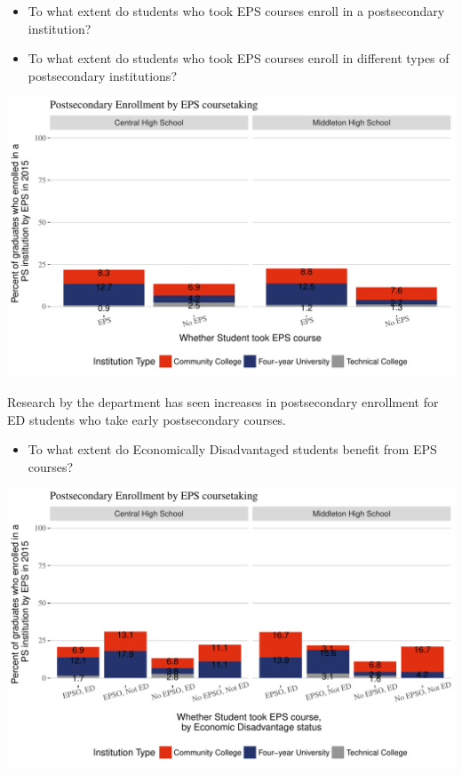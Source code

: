 \documentclass[11pt,]{article}
\providecommand{\tightlist}{%
  \setlength{\itemsep}{0pt}\setlength{\parskip}{0pt}}
\begin{document}
\begin{itemize}
\tightlist
\item
  To what extent do students who took EPS courses enroll in a
  postsecondary institution?
\item
  To what extent do students who took EPS courses enroll in different
  types of postsecondary institutions?
\end{itemize}

\includegraphics{20170411_PSWRR_no_CTE_files/figure-latex/Figure9d-1.pdf}

Research by the department has seen increases in postsecondary
enrollment for ED students who take early postsecondary courses.

\begin{itemize}
\tightlist
\item
  To what extent do Economically Disadvantaged students benefit from EPS
  courses?
\end{itemize}

\includegraphics{20170411_PSWRR_no_CTE_files/figure-latex/Figure9e-1.pdf}
\end{document}
